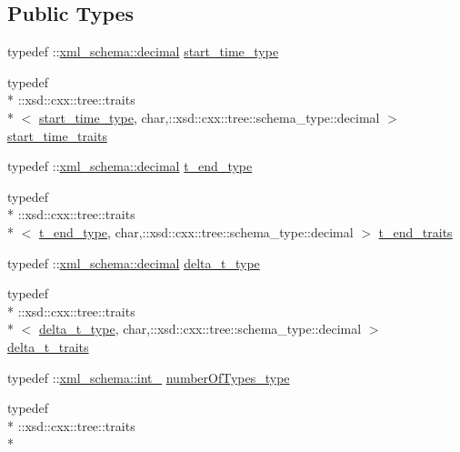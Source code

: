 \subsection*{Public Types}
\begin{DoxyCompactItemize}
\item 
typedef \-::\hyperlink{namespacexml__schema_a69bfaf24f63a8c18ebd8e21db6b343df}{xml\-\_\-schema\-::decimal} \hyperlink{classpse__t_a2b49c9d348499d75809e2b655582eb6f}{start\-\_\-time\-\_\-type}
\item 
typedef \\*
\-::xsd\-::cxx\-::tree\-::traits\\*
$<$ \hyperlink{classpse__t_a2b49c9d348499d75809e2b655582eb6f}{start\-\_\-time\-\_\-type}, char,\-::xsd\-::cxx\-::tree\-::schema\-\_\-type\-::decimal $>$ \hyperlink{classpse__t_ab28e5b3d2a24ea5a9b120b25dd1a27ac}{start\-\_\-time\-\_\-traits}
\item 
typedef \-::\hyperlink{namespacexml__schema_a69bfaf24f63a8c18ebd8e21db6b343df}{xml\-\_\-schema\-::decimal} \hyperlink{classpse__t_ac4239e9fa324e53f5964848e3089fef6}{t\-\_\-end\-\_\-type}
\item 
typedef \\*
\-::xsd\-::cxx\-::tree\-::traits\\*
$<$ \hyperlink{classpse__t_ac4239e9fa324e53f5964848e3089fef6}{t\-\_\-end\-\_\-type}, char,\-::xsd\-::cxx\-::tree\-::schema\-\_\-type\-::decimal $>$ \hyperlink{classpse__t_a4de32dd1347fe5653d7b6f581929e3ba}{t\-\_\-end\-\_\-traits}
\item 
typedef \-::\hyperlink{namespacexml__schema_a69bfaf24f63a8c18ebd8e21db6b343df}{xml\-\_\-schema\-::decimal} \hyperlink{classpse__t_a7af94a081ff80545fa4d069c4ba56b57}{delta\-\_\-t\-\_\-type}
\item 
typedef \\*
\-::xsd\-::cxx\-::tree\-::traits\\*
$<$ \hyperlink{classpse__t_a7af94a081ff80545fa4d069c4ba56b57}{delta\-\_\-t\-\_\-type}, char,\-::xsd\-::cxx\-::tree\-::schema\-\_\-type\-::decimal $>$ \hyperlink{classpse__t_a02b088d0313bad0fedf219ccf44ebe48}{delta\-\_\-t\-\_\-traits}
\item 
typedef \-::\hyperlink{namespacexml__schema_acfa24ac68e1a188e7f44c36f7a158bf4}{xml\-\_\-schema\-::int\-\_\-} \hyperlink{classpse__t_a3aa6a8cc1b9642304371fb935f6e1965}{number\-Of\-Types\-\_\-type}
\item 
typedef \\*
\-::xsd\-::cxx\-::tree\-::traits\\*

\end{DoxyCompactItemize}
